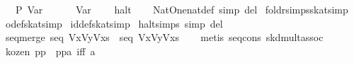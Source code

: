 \begin{isabellebody}
\ \ {}\ P\ {}Var\ {}{}\isanewline
\ \ {}\ {}\ {}{}\ Var\ {}\isanewline
\ \ {}\ halt\isanewline
\ \ {}{}\isanewline
\isanewline
{}\isamarkupfalse%
\ Nat{}One{}nat{}def\ {}simp\ del{}\isanewline
{}\isamarkupfalse%
\ foldr{}simps{}skat{}simp{}\isanewline
{}\isamarkupfalse%
\ o{}def{}skat{}simp{}\isanewline
{}\isamarkupfalse%
\ id{}def{}skat{}simp{}\isanewline
{}\isamarkupfalse%
\ halt{}simps{}{}{}\ {}simp\ del{}\isanewline
\isanewline
{}\isamarkupfalse%
\ seq{}merge{}\ {}seq\ {}Vx{}Vy{}Vxs{}\ {}\ seq\ {}Vx{}Vy{}Vxs{}{}\isanewline
%
\isadelimproof
\ \ %
\endisadelimproof
%
\isatagproof
{}\isamarkupfalse%
\ {}metis\ seq{}cons\ skd{}mult{}assoc{}%
\endisatagproof
{\isafoldproof}%
%
\isadelimproof
\isanewline
%
\endisadelimproof
\isanewline
{}\isamarkupfalse%
\ kozen{}{}\ {}p{}{}{}p{}{}\ {}\ p{}{}{}p{}{}{}{}a{}\ iff\ a{}{}{}\isanewline

\end{isabellebody}
